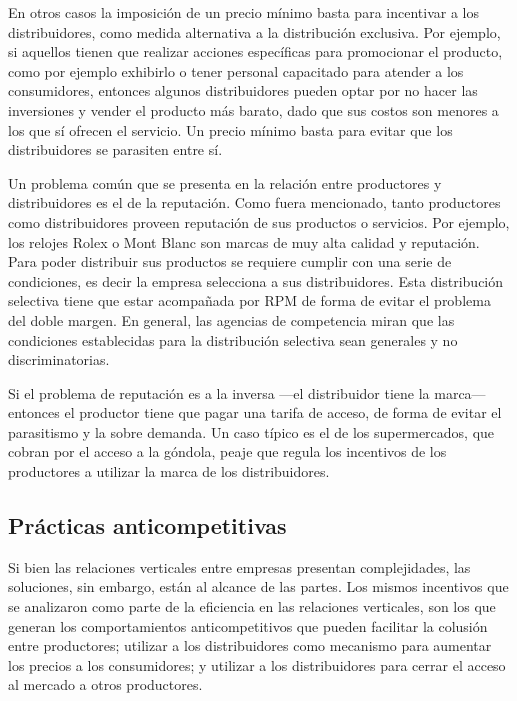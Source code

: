 \documentclass[
  12pt,
  spanish,
]{book}
\begin{document}
En otros casos la imposición de un precio mínimo basta para incentivar a
los distribuidores, como medida alternativa a la distribución exclusiva.
Por ejemplo, si aquellos tienen que realizar acciones específicas para
promocionar el producto, como por ejemplo exhibirlo o tener personal
capacitado para atender a los consumidores, entonces algunos
distribuidores pueden optar por no hacer las inversiones y vender el
producto más barato, dado que sus costos son menores a los que sí
ofrecen el servicio. Un precio mínimo basta para evitar que los
distribuidores se parasiten entre sí.

Un problema común que se presenta en la relación entre productores y
distribuidores es el de la reputación. Como fuera mencionado, tanto
productores como distribuidores proveen reputación de sus productos o
servicios. Por ejemplo, los relojes Rolex o Mont Blanc son marcas de muy
alta calidad y reputación. Para poder distribuir sus productos se
requiere cumplir con una serie de condiciones, es decir la empresa
selecciona a sus distribuidores. Esta distribución selectiva tiene que
estar acompañada por RPM de forma de evitar el problema del doble
margen. En general, las agencias de competencia miran que las
condiciones establecidas para la distribución selectiva sean generales y
no discriminatorias.

Si el problema de reputación es a la inversa ---el distribuidor tiene la
marca--- entonces el productor tiene que pagar una tarifa de acceso, de
forma de evitar el parasitismo y la sobre demanda. Un caso típico es el
de los supermercados, que cobran por el acceso a la góndola, peaje que
regula los incentivos de los productores a utilizar la marca de los
distribuidores.

\hypertarget{pruxe1cticas-anticompetitivas}{%
\subsection{Prácticas
anticompetitivas}\label{pruxe1cticas-anticompetitivas}}

Si bien las relaciones verticales entre empresas presentan
complejidades, las soluciones, sin embargo, están al alcance de las
partes. Los mismos incentivos que se analizaron como parte de la
eficiencia en las relaciones verticales, son los que generan los
comportamientos anticompetitivos que pueden facilitar la colusión entre
productores; utilizar a los distribuidores como mecanismo para aumentar
los precios a los consumidores; y utilizar a los distribuidores para
cerrar el acceso al mercado a otros productores.
\end{document}
